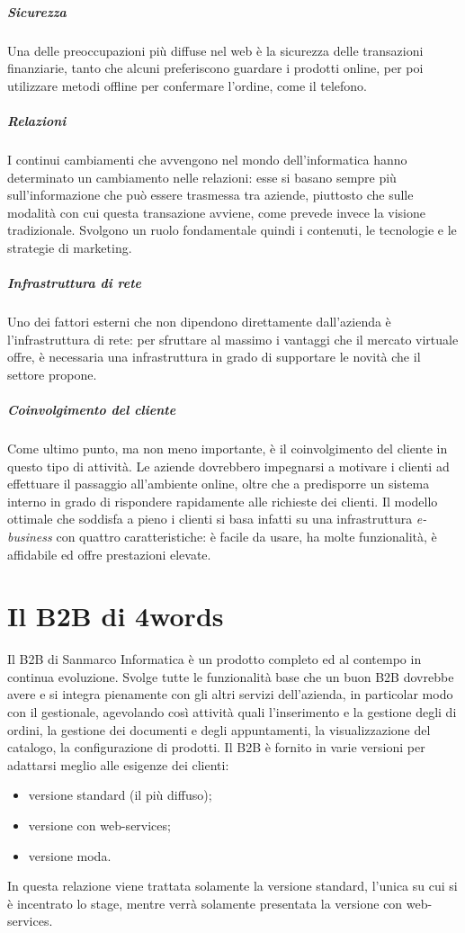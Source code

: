 \subparagraph{Sicurezza}
Una delle preoccupazioni più diffuse nel web è la sicurezza delle transazioni finanziarie, tanto che alcuni preferiscono guardare i prodotti online, per poi utilizzare metodi offline per confermare l'ordine, come il telefono.

\subparagraph{Relazioni}
I continui cambiamenti che avvengono nel mondo dell'informatica hanno determinato un cambiamento nelle relazioni: esse si basano sempre più sull'informazione che può essere trasmessa tra aziende, piuttosto che sulle modalità con cui questa transazione avviene, come prevede invece la visione tradizionale. Svolgono un ruolo fondamentale quindi i contenuti, le tecnologie e le strategie di marketing.

\subparagraph{Infrastruttura di rete}
Uno dei fattori esterni che non dipendono direttamente dall'azienda è l'infrastruttura di rete: per sfruttare al massimo i vantaggi che il mercato virtuale offre, è necessaria una infrastruttura in grado di supportare le novità che il settore propone. 

\subparagraph{Coinvolgimento del cliente}
Come ultimo punto, ma non meno importante, è il coinvolgimento del cliente in questo tipo di attività. Le aziende dovrebbero impegnarsi a motivare i clienti ad effettuare il passaggio all'ambiente online, oltre che a predisporre un sistema interno in grado di rispondere rapidamente alle richieste dei clienti.
Il modello ottimale che soddisfa a pieno i clienti si basa infatti su una infrastruttura \textit{e-business} con quattro caratteristiche: è facile da usare, ha molte funzionalità, è affidabile ed offre prestazioni elevate.

\section{Il B2B di 4words}
Il B2B di Sanmarco Informatica è un prodotto completo ed al contempo in continua evoluzione. Svolge tutte le funzionalità base che un buon B2B dovrebbe avere e si integra pienamente con gli altri servizi dell'azienda, in particolar modo con il gestionale, agevolando così attività quali l'inserimento e la gestione degli di ordini, la gestione dei documenti e degli appuntamenti, la visualizzazione del catalogo, la configurazione di prodotti. Il B2B è fornito in varie versioni per adattarsi meglio alle esigenze dei clienti:
\begin{itemize}
	\item versione standard (il più diffuso);
	\item versione con web-services;
	\item versione moda.
\end{itemize}
In questa relazione viene trattata solamente la versione standard, l'unica su cui si è incentrato lo stage, mentre verrà solamente presentata la versione con web-services.

